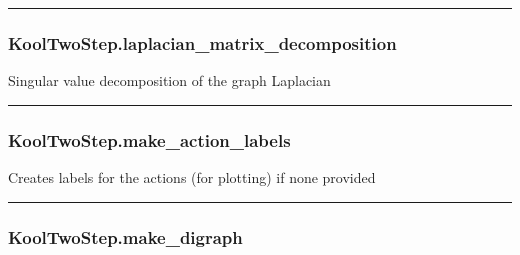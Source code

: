 \begin{center}\rule{0.5\linewidth}{\linethickness}\end{center}

\subsubsection{KoolTwoStep.laplacian\_matrix\_decomposition}\label{kooltwostep.laplacian_matrix_decomposition}

\begin{Shaded}
\begin{Highlighting}[]
\NormalTok{)}
\end{Highlighting}
\end{Shaded}

Singular value decomposition of the graph Laplacian

\begin{center}\rule{0.5\linewidth}{\linethickness}\end{center}

\subsubsection{KoolTwoStep.make\_action\_labels}\label{kooltwostep.make_action_labels}

\begin{Shaded}
\begin{Highlighting}[]
\NormalTok{)}
\end{Highlighting}
\end{Shaded}

Creates labels for the actions (for plotting) if none provided

\begin{center}\rule{0.5\linewidth}{\linethickness}\end{center}

\subsubsection{KoolTwoStep.make\_digraph}\label{kooltwostep.make_digraph}

\begin{Shaded}
\begin{Highlighting}[]
\NormalTok{)}
\end{Highlighting}
\end{Shaded}

